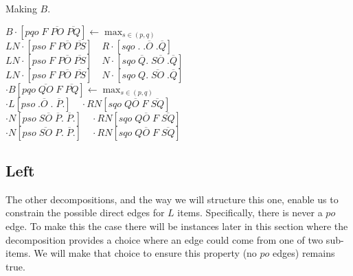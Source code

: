 \begin{finalEquation}
\caption{Making $B$.}
  $B\cdotp [pqo \; F \; \overline{PO} \; \overline{PQ}] \leftarrow \max_{s \in (p, q)}$\mbox{\hspace{2.5cm}} \\
  $LN\cdotp [pso \; F \; P\overline{O} \; \overline{PS}] \quad R\cdotp [sqo \; . \; .\overline{O} \; .\overline{Q}]$ \\
  $LN\cdotp [pso \; F \; P\overline{O} \; \overline{PS}] \quad N\cdotp [sqo \; \overline{Q}. \; S\overline{O} \; .\overline{Q}]$ \\
  $LN\cdotp [pso \; F \; P\overline{O} \; \overline{PS}] \quad N\cdotp [sqo \; Q. \; \overline{SO} \; .\overline{Q}]$ \\[4pt]

  $\cdotp B[pqo \; \overline{QO} \; F \; \overline{PQ}] \leftarrow \max_{s \in (p, q)}$\mbox{\hspace{2.5cm}} \\
  $\cdotp L[pso \; .\overline{O} \; . \; \overline{P}.] \quad \cdotp RN[sqo \; Q\overline{O} \; F \; \overline{SQ}]$ \\
  $\cdotp N[pso \; S\overline{O} \; \overline{P}. \; \overline{P}.] \quad \cdotp RN[sqo \; Q\overline{O} \; F \; \overline{SQ}]$ \\
  $\cdotp N[pso \; \overline{SO} \; P. \; \overline{P}.] \quad \cdotp RN[sqo \; Q\overline{O} \; F \; \overline{SQ}]$
\end{finalEquation}

\subsection{Left}
The other decompositions, and the way we will structure this one, enable us to constrain the possible direct edges for $L$ items.
Specifically, there is never a $po$ edge.
To make this the case there will be instances later in this section where the decomposition provides a choice where an edge could come from one of two sub-items.
We will make that choice to ensure this property (no $po$ edges) remains true.

\begin{center}
\end{center}

